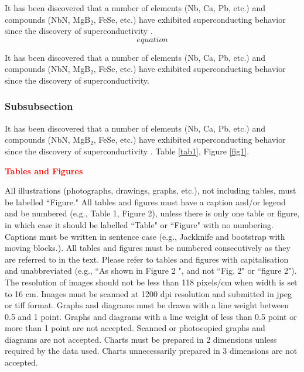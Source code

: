 \documentclass{article}
\begin{document}
It has been discovered that a number of elements (Nb, Ca, Pb, etc.) and 
compounds (NbN, MgB$_{2}$, FeSe, etc.) have exhibited superconducting 
behavior since the discovery of superconductivity \cite{2}. 
\begin{equation}
\label{eq2}
equation
\end{equation}

It has been discovered that a number of elements (Nb, Ca, Pb, etc.) and 
compounds (NbN, MgB$_{2}$, FeSe, etc.) have exhibited superconducting 
behavior since the discovery of superconductivity.

\subsubsection{Subsubsection}
It has been discovered that a number of elements (Nb, Ca, Pb, etc.) and 
compounds (NbN, MgB$_{2}$, FeSe, etc.) have exhibited superconducting 
behavior since the discovery of superconductivity \cite{1}. Table \ref{tab1}, Figure \ref{fig1}.

\textcolor{red}{\textbf{Tables and Figures}}

All illustrations (photographs, drawings, graphs, etc.), not including tables, must be labelled ``Figure."
All tables and figures must have a caption and/or legend and be numbered (e.g., Table 1, Figure 2), unless there is
only one table or figure, in which case it should be labelled ``Table" or ``Figure" with no numbering. Captions must be
written in sentence case (e.g., Jackknife and bootstrap with moving blocks.).
All tables and figures must be numbered consecutively as they are referred to in the text. Please refer to tables and
figures with capitalisation and unabbreviated (e.g., ``As shown in Figure 2 ", and not ``Fig. 2" or ``figure 2").
The resolution of images should not be less than 118 pixels/cm when width is set to 16 cm. Images must be scanned
at 1200 dpi resolution and submitted in jpeg or tiff format.
Graphs and diagrams must be drawn with a line weight between 0.5 and 1 point. Graphs and diagrams with a line
weight of less than 0.5 point or more than 1 point are not accepted. Scanned or photocopied graphs and diagrams are not
accepted.
Charts must be prepared in 2 dimensions unless required by the data used. Charts unnecessarily prepared in 3
dimensions are not accepted.
\end{document}

